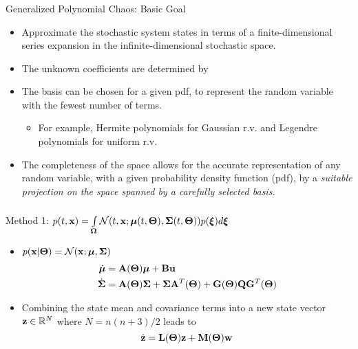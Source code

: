 \documentclass{beamer}
\begin{document}
\begin{frame}\frametitle{\color{black}{Proposed Approach}}\framesubtitle{\color{white}{$\dot{\x} = \A(\Th)\x + \B(\Th)\u+ \G(\Th)\et$}}

\begin{block}{Generalized Polynomial Chaos: Basic Goal}
\begin{itemize}
\item Approximate the stochastic system states in terms of \alert{a finite-dimensional series expansion} in the infinite-dimensional stochastic space.
\item The unknown coefficients are determined by {\color{blue}{minimizing an appropriate norm of the residual.}}
\item The basis can be chosen for a given pdf, to represent the random variable with the fewest number of terms.
\begin{itemize}
\item For example, Hermite polynomials for Gaussian r.v. and Legendre polynomials for uniform r.v.
\end{itemize}
\item \alert{The completeness of the space} allows for the accurate representation of any random variable, with a given probability density function (pdf), by a \textit{suitable projection on the space spanned by a carefully selected basis.}
\end{itemize}
\end{block}
 \end{frame}


\begin{frame}\frametitle{\color{black}{Proposed Approach}}\framesubtitle{\color{white}{$\dot{\x} = \A(\Th)\x + \B(\Th)\u+ \G(\Th)\et$}}

\begin{block}{Method 1: $p(t,\mathbf{x})=\int\limits_{\boldsymbol{\Omega}}\mathcal{N}(t,\mathbf{x};\boldsymbol{\mu}(t,\boldsymbol{\Theta}),\boldsymbol{\Sigma}(t,\boldsymbol{\Theta}))p(\boldsymbol{\xi})d\boldsymbol{\xi} $}
\begin{itemize}
\item<1-> $p(\mathbf{x}|\boldsymbol{\Theta})=\mathcal{N}(\mathbf{x};\boldsymbol{\mu},\boldsymbol{\Sigma})$
\begin{align}\label{meanG}
\dot{\boldsymbol{\mu}} &=\mathbf{A}(\boldsymbol{\Theta})\boldsymbol{\mu} + \mathbf{B}\mathbf{u}\\
\dot{\boldsymbol{\Sigma}} &= \mathbf{A}(\boldsymbol{\Theta})\boldsymbol{\Sigma}+\boldsymbol{\Sigma}\mathbf{A}^T(\boldsymbol{\Theta})+\mathbf{G}(\boldsymbol{\Theta}) \mathbf{Q} \mathbf{G}^T(\boldsymbol{\Theta})
\end{align}
\item Combining the state mean and covariance terms into a new state vector $\mathbf{z} \in \mathbb R^N$ where $N = n(n+3)/2$ leads to
\begin{equation}
\dot{\mathbf{z}}= \mathbf{L}(\boldsymbol{\Theta})\mathbf{z}+\mathbf{M}(\boldsymbol{\Theta})\mathbf{w} \label{sysdet2}
\end{equation}
\end{itemize}
\end{block}
\end{frame}
\end{document}
